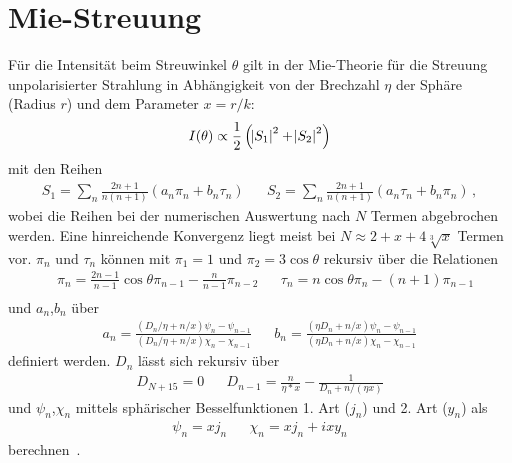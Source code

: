 \chapter{Mie-Streuung}
\label{app:mie}
Für die Intensität beim Streuwinkel $\theta$ gilt in der Mie-Theorie für die Streuung unpolarisierter Strahlung in Abhängigkeit von der Brechzahl $\eta$ der Sphäre (Radius $r$) und dem Parameter $x=r/k$:
\begin{equation}
	I(\theta)\propto\frac{1}{2}\left(\abs{S_1}^2+\abs{S_2}^2\right)
\end{equation} 
mit den Reihen
\begin{align}
	S_1=\sum_n{\frac{2n+1}{n(n+1)}(a_n\pi_n+b_n\tau_n)} &   & S_2=\sum_n{\frac{2n+1}{n(n+1)}(a_n\tau_n+b_n\pi_n)}\,, 
\end{align}
wobei die Reihen bei der numerischen Auswertung nach $N$ Termen abgebrochen werden. Eine hinreichende Konvergenz liegt meist bei $N\approx2+x+4\sqrt[3]{x}$ Termen vor.  $\pi_n$ und $\tau_n$ können mit $\pi_1=1$ und  $\pi_2=3\cos{\theta}$ rekursiv über die Relationen
\begin{align}
	  & \pi_n=\frac{2n-1}{n-1}\cos{\theta}\pi_{n-1}-\frac{n}{n-1}\pi_{n-2} &   & \tau_n=n\cos{\theta}\pi_n-(n+1)\pi_{n-1} \\
\end{align}
und $a_n$,$b_n$ über 
\begin{align}
	a_n=\frac{(D_n/\eta+n/x)\psi_n-\psi_{n-1}}{(D_n/\eta+n/x)\chi_n-\chi_{n-1}} &   &   
	b_n=\frac{(\eta D_n+n/x)\psi_n-\psi_{n-1}}{(\eta D_n+n/x)\chi_n-\chi_{n-1}}
\end{align} definiert werden. $D_n$ lässt sich rekursiv über
\begin{align}
	D_{N+15}=0 &   & D_{n-1}=\frac{n}{\eta*x}-\frac{1}{D_n+n/(\eta x)} 
\end{align}
und $\psi_n$,$\chi_n$ mittels sphärischer Besselfunktionen 1. Art ($j_n$) und 2. Art ($y_n$) als 
\begin{align}
	\psi_n=x j_n &   & \chi_n=x j_n+ixy_n 
\end{align}
berechnen~\cite{bohren1983,maetzler2002}.


